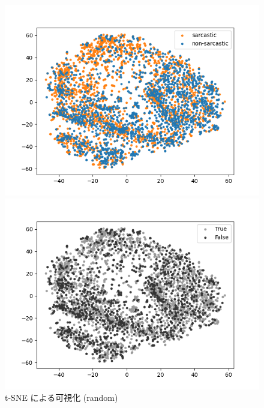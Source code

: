 \begin{figure}[tb]
\begin{center}
 	\begin{minipage}{0.4\hsize}
	\begin{center}
\includegraphics[width=\linewidth]{./figure/tsne_sarc_random.png}
	\end{center}
	\end{minipage}
 	\begin{minipage}{0.4\hsize}
	\begin{center}
\includegraphics[width=\linewidth]{./figure/tsne_TorF_random.png}
 	 \end{center}
 	\end{minipage}
	\caption{t-SNE による可視化 (random)}
	\label{fig:40_tsne5}
\end{center}
\end{figure}







